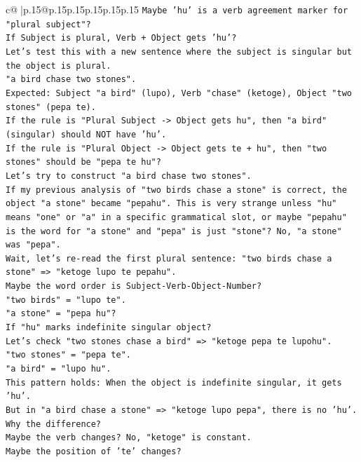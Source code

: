 \documentclass{article}
\begin{document}
{\begin{supertabular}{c@{$\;$}|p{.15\linewidth}@{}p{.15\linewidth}p{.15\linewidth}p{.15\linewidth}p{.15\linewidth}p{.15\linewidth}}
{{{\texttt{Maybe 'hu' is a verb agreement marker for "plural subject"?} \\
\texttt{If Subject is plural, Verb + Object gets 'hu'?} \\
\texttt{Let's test this with a new sentence where the subject is singular but the object is plural.} \\
\texttt{"a bird chase two stones".} \\
\texttt{Expected: Subject "a bird" (lupo), Verb "chase" (ketoge), Object "two stones" (pepa te).} \\
\texttt{If the rule is "Plural Subject {-}> Object gets hu", then "a bird" (singular) should NOT have 'hu'.} \\
\texttt{If the rule is "Plural Object {-}> Object gets te + hu", then "two stones" should be "pepa te hu"?} \\
\texttt{Let's try to construct "a bird chase two stones".} \\
\texttt{If my previous analysis of "two birds chase a stone" is correct, the object "a stone" became "pepahu". This is very strange unless "hu" means "one" or "a" in a specific grammatical slot, or maybe "pepahu" is the word for "a stone" and "pepa" is just "stone"? No, "a stone" was "pepa".} \\
\texttt{Wait, let's re{-}read the first plural sentence: "two birds chase a stone" => "ketoge lupo te pepahu".} \\
\texttt{Maybe the word order is Subject{-}Verb{-}Object{-}Number?} \\
\texttt{"two birds" = "lupo te".} \\
\texttt{"a stone" = "pepa hu"?} \\
\texttt{If "hu" marks indefinite singular object?} \\
\texttt{Let's check "two stones chase a bird" => "ketoge pepa te lupohu".} \\
\texttt{"two stones" = "pepa te".} \\
\texttt{"a bird" = "lupo hu".} \\
\texttt{This pattern holds: When the object is indefinite singular, it gets 'hu'.} \\
\texttt{But in "a bird chase a stone" => "ketoge lupo pepa", there is no 'hu'.} \\
\texttt{Why the difference?} \\
\texttt{Maybe the verb changes? No, "ketoge" is constant.} \\
\texttt{Maybe the position of 'te' changes?} \\
}}}
\end{supertabular}}
\end{document}
